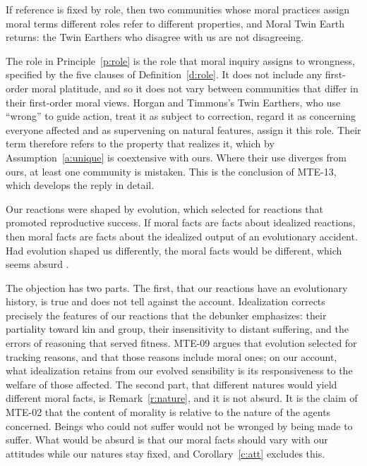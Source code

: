 \documentclass{situationist-preprint}
\begin{document}
\begin{objection}
If reference is fixed by role, then two communities whose moral practices assign moral terms different roles refer to different properties, and Moral Twin Earth returns: the Twin Earthers who disagree with us are not disagreeing.
\end{objection}

\begin{reply}
The role in Principle~\ref{p:role} is the role that moral inquiry assigns to wrongness, specified by the five clauses of Definition~\ref{d:role}. It does not include any first-order moral platitude, and so it does not vary between communities that differ in their first-order moral views. Horgan and Timmons's Twin Earthers, who use \enquote{wrong} to guide action, treat it as subject to correction, regard it as concerning everyone affected and as supervening on natural features, assign it this role. Their term therefore refers to the property that realizes it, which by Assumption~\ref{a:unique} is coextensive with ours. Where their use diverges from ours, at least one community is mistaken. This is the conclusion of MTE-13, which develops the reply in detail.
\end{reply}

\begin{objection}[Debunking]
Our reactions were shaped by evolution, which selected for reactions that promoted reproductive success. If moral facts are facts about idealized reactions, then moral facts are facts about the idealized output of an evolutionary accident. Had evolution shaped us differently, the moral facts would be different, which seems absurd \citep{Street2006}.
\end{objection}

\begin{reply}
The objection has two parts. The first, that our reactions have an evolutionary history, is true and does not tell against the account. Idealization corrects precisely the features of our reactions that the debunker emphasizes: their partiality toward kin and group, their insensitivity to distant suffering, and the errors of reasoning that served fitness. MTE-09 argues that evolution selected for tracking reasons, and that those reasons include moral ones; on our account, what idealization retains from our evolved sensibility is its responsiveness to the welfare of those affected. The second part, that different natures would yield different moral facts, is Remark~\ref{r:nature}, and it is not absurd. It is the claim of MTE-02 that the content of morality is relative to the nature of the agents concerned. Beings who could not suffer would not be wronged by being made to suffer. What would be absurd is that our moral facts should vary with our attitudes while our natures stay fixed, and Corollary~\ref{c:att} excludes this.
\end{reply}
\end{document}
